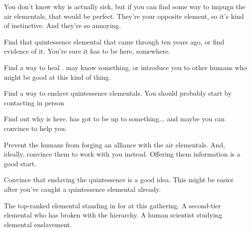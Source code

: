 \documentclass[char]{elementals}
\begin{document}
You don't know why \cEarthKing{} is actually sick, but if you can find some way to impugn the air elementals, that would be perfect.  They're your opposite element, so it's kind of instinctive.  And they're so annoying.


\begin{itemz}[Goals]
	\item Find that quintessence elemental that came through ten years ago, or find evidence of it.  You're sure it has to be here, somewhere.
	\item Find a way to heal \cEarthKing{}.  \cMS{} may know something, or introduce you to other humans who might be good at this kind of thing.
	\item Find a way to enslave quintessence elementals.  You should probably start by contacting \cMS{} in person
	\item Find out why \cRogue{} is here.  \cRogue{\They} has got to be up to something... and maybe you can convince \cRogue{\them} to help you.
	\item Prevent the humans from forging an alliance with the air elementals.  And, ideally, convince them to work with you instead.  Offering them information is a good start.
	\item Convince \cLoyal{} that enslaving the quintessence is a good idea.  This might be easier after you've caught a quintessence elemental already.
\end{itemz}

\begin{contacts}
	\contact{\cLoyal{}}  The top-ranked elemental standing in for \cEarthKing{} at this gathering.
	\contact{\cRogue{}}  A second-tier elemental who has broken with the hierarchy.
	\contact{\cMS{}}  A human scientist studying elemental enslavement.
\end{contacts}
\end{document}
